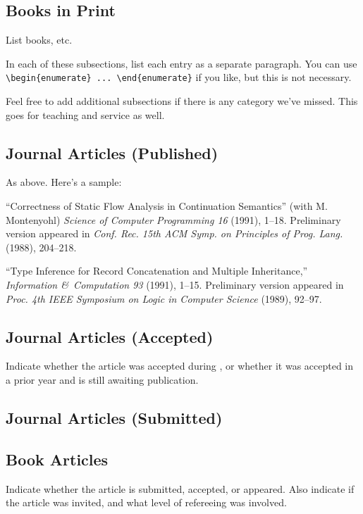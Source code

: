 \subsection{Books in Print}

List books, etc.  

In each of these subsections, list each entry as a separate paragraph.  You
can use \verb|\begin{enumerate} ... \end{enumerate}| if you like, but this is
not necessary.

Feel free to add additional subsections if there is any category we've
missed.   This goes for teaching and service as well.

\subsection{Journal Articles (Published)}

As above.  Here's a sample:

``Correctness of Static Flow Analysis in Continuation Semantics'' (with M.
Montenyohl) {\em {Science of Computer Programming 16}} (1991), 1--18.
Preliminary version appeared in {\it Conf. Rec. 15th ACM Symp. on Principles
of Prog. Lang.\/} (1988), 204--218.

``Type Inference for Record Concatenation and Multiple Inheritance,''
{\it {Information \&\ Computation 93}\/} (1991), 1--15.  Preliminary version
appeared in {\it Proc. 4th IEEE Symposium on Logic in Computer Science\/} (1989), 92--97.

\subsection{Journal Articles (Accepted)}

Indicate whether the article was accepted during \reportyear, or whether it was accepted in a prior year and is still awaiting publication.

\subsection{Journal Articles (Submitted)}

\subsection{Book Articles}

Indicate whether the article is submitted, accepted, or appeared.  Also indicate if the article was invited, and what level of refereeing was involved.

